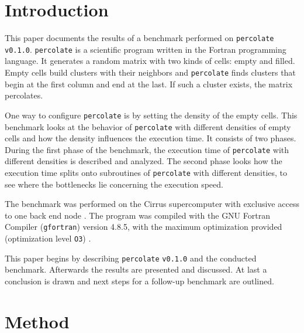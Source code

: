 \documentclass[twoside,11pt]{article}
\title{\titl}
\author{}
\def\perc{\texttt{perco\-late}}
\def\v{\texttt{v0.1.0}}
\begin{document}
\maketitle

\begin{abstract}
\end{abstract}

\begin{keywords}
\end{keywords}

\section{Introduction} %

This paper documents the results of a benchmark performed
on \perc{} \v{}.
\perc{} is a scientific program written in the
Fortran programming language. It generates a random matrix
with two kinds of cells: empty and filled.
Empty cells build clusters with their neighbors and
\perc{} finds clusters that begin at the first column and
end at the last.
If such a cluster exists, the matrix percolates.

One way to configure \perc{} is by setting the density of
the empty cells.
This benchmark looks at the behavior of \perc{} with
different densities of empty cells and how the density
influences the execution time.
It consists of two phases.
During the first phase of the benchmark, the execution time
of \perc{} with different densities is described and
analyzed.
The second phase looks how the execution time splits onto
subroutines of \perc{} with different densities, to see
where the bottlenecks lie concerning the execution speed.

The benchmark was performed on the Cirrus supercomputer
with exclusive access to one back end node
\citep[see][]{cirrus}.
The program was compiled with the GNU Fortran Compiler
(\texttt{gfortran}) version 4.8.5, with the maximum
optimization provided (optimization level \texttt{O3})
\citep[see][]{gfortran}.

This paper begins by describing \perc{} \v{} and the
conducted benchmark.
Afterwards the results are presented and discussed.
At last a conclusion is drawn and next steps for a
follow-up benchmark are outlined.

\section{Method} %
\end{document}
